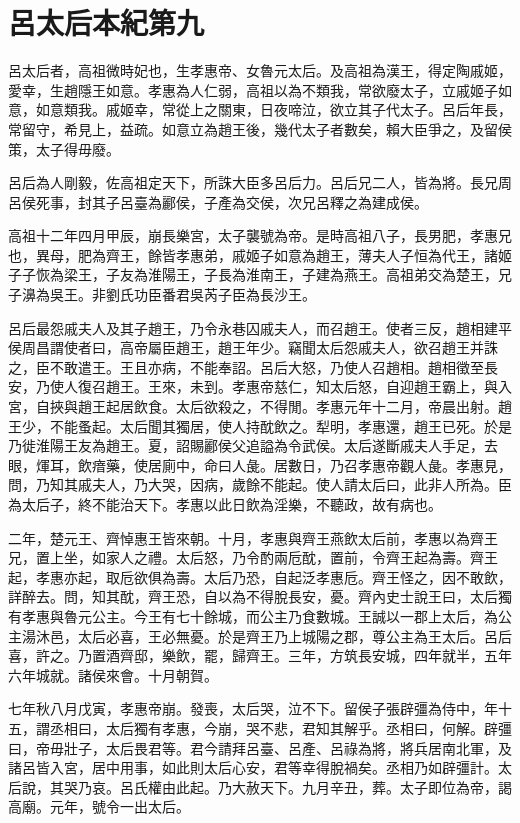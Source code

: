 \chapter{呂太后本紀第九}

呂太后者，高祖微時妃也，生孝惠帝、女魯元太后。及高祖為漢王，得定陶戚姬，愛幸，生趙隱王如意。孝惠為人仁弱，高祖以為不類我，常欲廢太子，立戚姬子如意，如意類我。戚姬幸，常從上之關東，日夜啼泣，欲立其子代太子。呂后年長，常留守，希見上，益疏。如意立為趙王後，幾代太子者數矣，賴大臣爭之，及留侯策，太子得毋廢。

呂后為人剛毅，佐高祖定天下，所誅大臣多呂后力。呂后兄二人，皆為將。長兄周呂侯死事，封其子呂臺為酈侯，子產為交侯，次兄呂釋之為建成侯。

高祖十二年四月甲辰，崩長樂宮，太子襲號為帝。是時高祖八子，長男肥，孝惠兄也，異母，肥為齊王，餘皆孝惠弟，戚姬子如意為趙王，薄夫人子恒為代王，諸姬子子恢為梁王，子友為淮陽王，子長為淮南王，子建為燕王。高祖弟交為楚王，兄子濞為吳王。非劉氏功臣番君吳芮子臣為長沙王。

呂后最怨戚夫人及其子趙王，乃令永巷囚戚夫人，而召趙王。使者三反，趙相建平侯周昌謂使者曰，高帝屬臣趙王，趙王年少。竊聞太后怨戚夫人，欲召趙王并誅之，臣不敢遣王。王且亦病，不能奉詔。呂后大怒，乃使人召趙相。趙相徵至長安，乃使人復召趙王。王來，未到。孝惠帝慈仁，知太后怒，自迎趙王霸上，與入宮，自挾與趙王起居飲食。太后欲殺之，不得閒。孝惠元年十二月，帝晨出射。趙王少，不能蚤起。太后聞其獨居，使人持酖飲之。犁明，孝惠還，趙王已死。於是乃徙淮陽王友為趙王。夏，詔賜酈侯父追謚為令武侯。太后遂斷戚夫人手足，去眼，煇耳，飲瘖藥，使居廁中，命曰人彘。居數日，乃召孝惠帝觀人彘。孝惠見，問，乃知其戚夫人，乃大哭，因病，歲餘不能起。使人請太后曰，此非人所為。臣為太后子，終不能治天下。孝惠以此日飲為淫樂，不聽政，故有病也。

二年，楚元王、齊悼惠王皆來朝。十月，孝惠與齊王燕飲太后前，孝惠以為齊王兄，置上坐，如家人之禮。太后怒，乃令酌兩卮酖，置前，令齊王起為壽。齊王起，孝惠亦起，取卮欲俱為壽。太后乃恐，自起泛孝惠卮。齊王怪之，因不敢飲，詳醉去。問，知其酖，齊王恐，自以為不得脫長安，憂。齊內史士說王曰，太后獨有孝惠與魯元公主。今王有七十餘城，而公主乃食數城。王誠以一郡上太后，為公主湯沐邑，太后必喜，王必無憂。於是齊王乃上城陽之郡，尊公主為王太后。呂后喜，許之。乃置酒齊邸，樂飲，罷，歸齊王。三年，方筑長安城，四年就半，五年六年城就。諸侯來會。十月朝賀。

七年秋八月戊寅，孝惠帝崩。發喪，太后哭，泣不下。留侯子張辟彊為侍中，年十五，謂丞相曰，太后獨有孝惠，今崩，哭不悲，君知其解乎。丞相曰，何解。辟彊曰，帝毋壯子，太后畏君等。君今請拜呂臺、呂產、呂祿為將，將兵居南北軍，及諸呂皆入宮，居中用事，如此則太后心安，君等幸得脫禍矣。丞相乃如辟彊計。太后說，其哭乃哀。呂氏權由此起。乃大赦天下。九月辛丑，葬。太子即位為帝，謁高廟。元年，號令一出太后。

